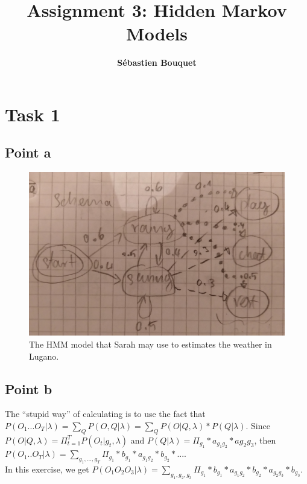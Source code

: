 \documentclass[11pt]{article}
\title{Assignment 3: Hidden Markov Models}
\author{\textbf{Sébastien Bouquet}}
\date{}
\begin{document}
\maketitle
\section{Task 1}
\subsection{Point a}
\begin{figure}[!ht]
\center
\includegraphics[width=.5\columnwidth]{hmm_task1}
\caption{The HMM model that Sarah may use to estimates the weather in Lugano.}
\label{fig:hmm-task1}
\end{figure}

\subsection{Point b}
The ``stupid way'' of calculating is to use the fact that $P(O_1...O_T| \lambda) = \sum_Q P(O,Q| \lambda) = \sum_Q P(O|Q, \lambda)*P(Q | \lambda)$. Since $P(O|Q, \lambda) = \Pi_{t=1}^T P(O_t | g_t, \lambda)$ and $P(Q | \lambda) = \Pi_{g_1}*a_{g_1g_2}*a{g_2g_3}$, then $P(O_1..O_T|\lambda) = \sum_{g_1,...,g_T} \Pi_{g_1}*b_{g_1}*a_{g_1g_2} * b_{g_2} * ...$. \\ 
In this exercise, we get $P(O_1O_2O_3|\lambda) = \sum_{g_1,g_2,g_3} \Pi_{g_1}*b_{g_1}*a_{g_1g_2}*b_{g_2}*a_{g_2g_3}*b_{g_3}$. \\
\end{document}
